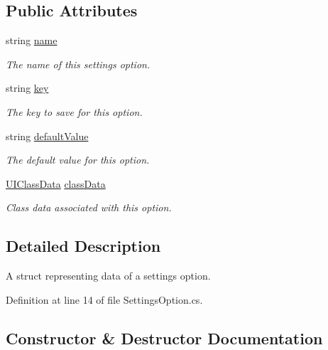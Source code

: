 \subsection*{Public Attributes}
\begin{DoxyCompactItemize}
\item 
string \hyperlink{struct_settings_option_a1be88b9055b5af9a446c79c9a3c83309}{name}
\begin{DoxyCompactList}\small\item\em The name of this settings option. \end{DoxyCompactList}\item 
string \hyperlink{struct_settings_option_ac60a29ea672ec85132988edcc63231c9}{key}
\begin{DoxyCompactList}\small\item\em The key to save for this option. \end{DoxyCompactList}\item 
string \hyperlink{struct_settings_option_ad1803ed7f7f271e958ca15612fe0f7d2}{default\+Value}
\begin{DoxyCompactList}\small\item\em The default value for this option. \end{DoxyCompactList}\item 
\hyperlink{struct_u_i_class_data}{U\+I\+Class\+Data} \hyperlink{struct_settings_option_abacd826cad9a79d394bffbb78f51e9eb}{class\+Data}
\begin{DoxyCompactList}\small\item\em Class data associated with this option. \end{DoxyCompactList}\end{DoxyCompactItemize}


\subsection{Detailed Description}
A struct representing data of a settings option. 



Definition at line 14 of file Settings\+Option.\+cs.



\subsection{Constructor \& Destructor Documentation}
\mbox{\label{struct_settings_option_a5542a38db1bc61aeb988b63563bc8d62}} 
